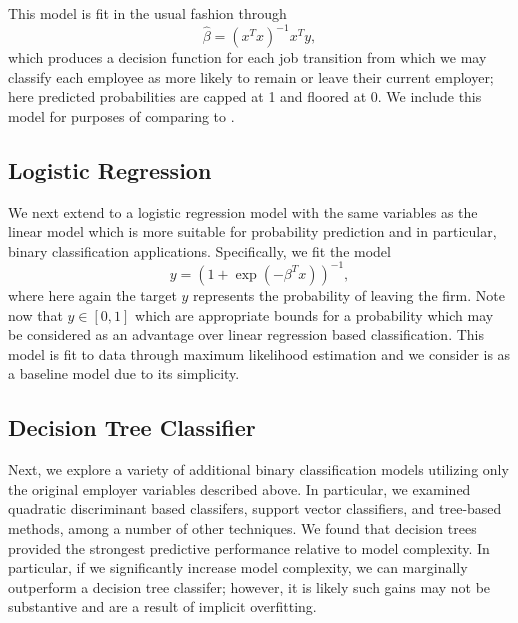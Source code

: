 \documentclass[10pt]{article}
\begin{document}
This model is fit in the usual fashion through 
%
\begin{equation}
    \hat{\beta} = (x^Tx)^{-1}x^Ty,
\end{equation}
%
which produces a decision function for each job transition from which we may classify 
each employee as more likely to remain or leave their current employer; here predicted probabilities 
are capped at 1 and floored at 0.  We include this model for purposes of comparing to 
\cite{Smart2016}.

\subsection{Logistic Regression} 
\hspace{\parindent}
We next extend to a logistic regression model with the 
same variables as the linear model which 
is more suitable for probability prediction and in particular, binary classification 
applications.   Specifically, we fit the model 
%
\begin{equation}
    y = (1+\exp(-\beta^Tx))^{-1},
\end{equation}
% 
where here again the target $y$ represents the probability of leaving the firm. 
Note now that $y\in[0,1]$ which are appropriate bounds for a probability which may be 
considered as an advantage over linear regression based classification.  This 
model is fit to data through maximum likelihood estimation and we consider 
is as a baseline model due to its simplicity.

\subsection{Decision Tree Classifier}  
\hspace{\parindent}
Next, we explore a variety of additional 
binary classification models utilizing only the original employer variables described above.
In particular, we examined quadratic discriminant based classifers, support vector classifiers, 
and tree-based methods, among a number of other techniques.  We found that decision 
trees provided the strongest predictive performance relative to model complexity. 
In particular, if we significantly increase model complexity, we can marginally outperform 
a decision tree classifer; however, it is likely such gains may not be substantive and 
are a result of implicit overfitting. 
\end{document}
